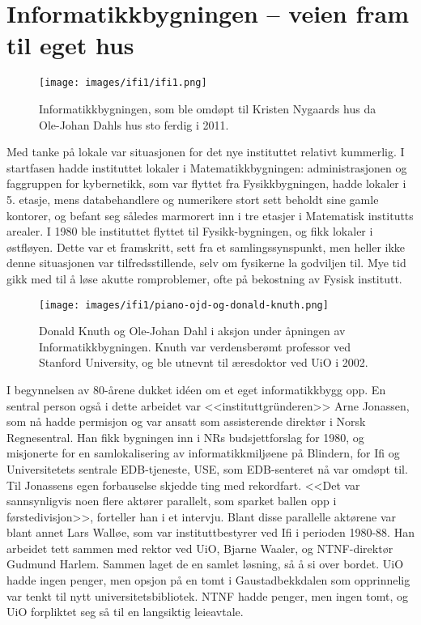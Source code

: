 \chapter[Ifi 1]{Informatikkbygningen – veien fram til eget hus}

\label{chap:ifi1}

\author{Skrevet av Narve Trædal}

\begin{figure}[h!]
	\centering
	\texttt{[image: images/ifi1/ifi1.png]}
	\caption{Informatikkbygningen, som ble omdøpt til Kristen Nygaards hus da Ole-Johan Dahls hus sto ferdig i 2011.}
\end{figure}

Med tanke på lokale var situasjonen for det nye instituttet relativt kummerlig. I startfasen hadde instituttet lokaler i Matematikkbygningen: administrasjonen og faggruppen for kybernetikk, som var flyttet fra Fysikkbygningen, hadde lokaler i 5. etasje, mens databehandlere og numerikere stort sett beholdt sine gamle kontorer, og befant seg således marmorert inn i tre etasjer i Matematisk institutts arealer. I 1980 ble instituttet flyttet til Fysikk-bygningen, og fikk lokaler i østfløyen. Dette var et framskritt, sett fra et samlingssynspunkt, men heller ikke denne situasjonen var tilfredsstillende, selv om fysikerne la godviljen til. Mye tid gikk med til å løse akutte romproblemer, ofte på bekostning av Fysisk institutt.

\begin{wrapfigure}{r}{8cm}
\centering
\texttt{[image: images/ifi1/piano-ojd-og-donald-knuth.png]}
	\caption{Donald Knuth og Ole-Johan Dahl i aksjon under åpningen av Informatikkbygningen. Knuth var verdensberømt professor ved Stanford University, og ble utnevnt til æresdoktor ved UiO i 2002.}
\end{wrapfigure}

I begynnelsen av 80-årene dukket idéen om et eget informatikkbygg opp. En sentral person også i dette arbeidet var <<instituttgründeren>> Arne Jonassen, som nå hadde permisjon og var ansatt som assisterende direktør i Norsk Regnesentral. Han fikk bygningen inn i NRs budsjettforslag for 1980, og misjonerte for en samlokalisering av informatikkmiljøene på Blindern, for Ifi og Universitetets sentrale EDB-tjeneste, USE, som EDB-senteret nå var omdøpt til. Til Jonassens egen forbauselse skjedde ting med rekordfart. <<Det var sannsynligvis noen flere aktører parallelt, som sparket ballen opp i førstedivisjon>>, forteller han i et intervju. Blant disse parallelle aktørene var blant annet Lars Walløe, som var instituttbestyrer ved Ifi i perioden 1980-88. Han arbeidet tett sammen med rektor ved UiO, Bjarne Waaler, og NTNF-direktør Gudmund Harlem. Sammen laget de en samlet løsning, så å si over bordet. UiO hadde ingen penger, men opsjon på en tomt i Gaustadbekkdalen som opprinnelig var tenkt til nytt universitetsbibliotek. NTNF hadde penger, men ingen tomt, og UiO forpliktet seg så til en langsiktig leieavtale.


